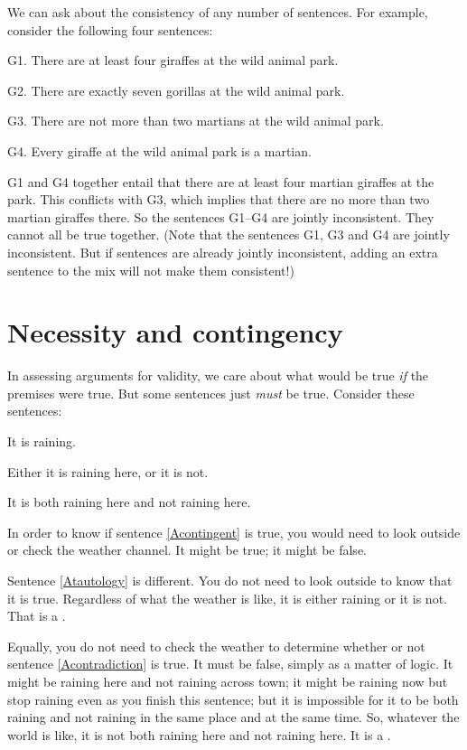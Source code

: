 We can ask about the consistency of any number of sentences. For example, consider the following four sentences:
	\label{MartianGiraffes}
	\begin{ebullet}
		\item[G1.] There are at least four giraffes at the wild animal park.
		\item[G2.] There are exactly seven gorillas at the wild animal park.
		\item[G3.] There are not more than two martians at the wild animal park.
		\item[G4.] Every giraffe at the wild animal park is a martian.
	\end{ebullet}
G1 and G4 together entail that there are at least four martian giraffes at the park. This conflicts with G3, which implies that there are no more than two martian giraffes there. So the sentences G1--G4 are jointly inconsistent. They cannot all be true together. (Note that the sentences G1, G3 and G4 are jointly inconsistent. But if sentences are already jointly inconsistent, adding an extra sentence to the mix will not make them consistent!)


\section{Necessity and contingency}
In assessing arguments for validity, we care about what would be true \emph{if} the premises were true. But some sentences just \emph{must} be true. Consider these sentences:
	\begin{earg}
		\item[\ex{Acontingent}] It is raining.
		\item[\ex{Atautology}] Either it is raining here, or it is not.
		\item[\ex{Acontradiction}] It is both raining here and not raining here.
	\end{earg}
In order to know if sentence \ref{Acontingent} is true, you would need to look outside or check the weather channel. It might be true; it might be false.

Sentence \ref{Atautology} is different. You do not need to look outside to know that it is true. Regardless of what the weather is like, it is either raining or it is not. That is a . 

Equally, you do not need to check the weather to determine whether or not sentence \ref{Acontradiction} is true. It must be false, simply as a matter of logic. It might be raining here and not raining across town; it might be raining now but stop raining even as you finish this sentence; but it is impossible for it to be both raining and not raining in the same place and at the same time. So, whatever the world is like, it is not both raining here and not raining here. It is a .

